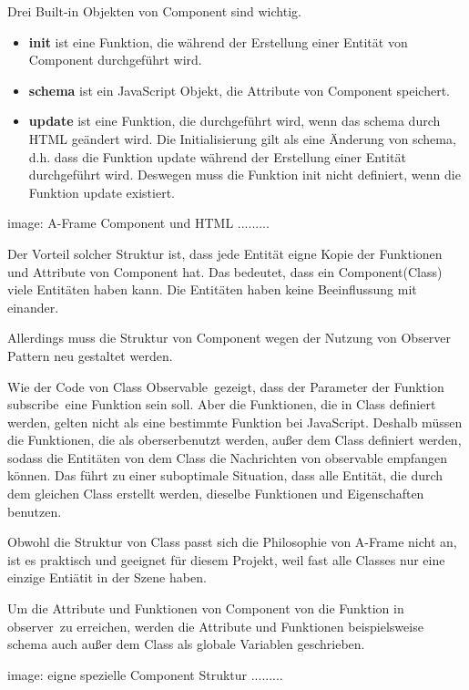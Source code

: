  Drei Built-in Objekten von Component sind wichtig.
 \begin{itemize}
     \item \textbf{init} ist eine Funktion, die während der Erstellung einer Entität von Component durchgeführt wird.
     \item \textbf{schema} ist ein JavaScript Objekt, die Attribute von Component speichert.
     \item \textbf{update} ist eine Funktion, die durchgeführt wird, wenn das schema durch HTML geändert wird. Die Initialisierung gilt als eine Änderung von schema, d.h. dass die Funktion update während der Erstellung einer Entität durchgeführt wird. Deswegen muss die Funktion init nicht definiert, wenn die Funktion update existiert.
 \end{itemize}
 
 image: A-Frame Component und HTML .........
 
 Der Vorteil solcher Struktur ist, dass jede Entität eigne Kopie der Funktionen und Attribute von Component hat. Das bedeutet, dass ein Component(Class) viele Entitäten haben kann. Die Entitäten haben keine Beeinflussung mit einander.
 
 Allerdings muss die Struktur von Component wegen der Nutzung von Observer Pattern neu gestaltet werden.
 
 Wie der Code von Class \glqq Observable\grqq\ gezeigt, dass der Parameter der Funktion \glqq subscribe\grqq\ eine Funktion sein soll. Aber die Funktionen, die in Class definiert werden, gelten nicht als eine bestimmte Funktion bei JavaScript. Deshalb müssen die Funktionen, die als \glqq oberser\grqq benutzt werden, außer dem Class definiert werden, sodass die Entitäten von dem Class die Nachrichten von observable empfangen können. Das führt zu einer suboptimale Situation, dass alle Entität, die durch dem gleichen Class erstellt werden, dieselbe Funktionen und Eigenschaften benutzen.
 
 Obwohl die Struktur von Class passt sich die Philosophie von A-Frame nicht an, ist es praktisch und geeignet für diesem Projekt, weil fast alle Classes nur eine einzige Entiätit in der Szene haben.
 
 Um die Attribute und Funktionen von Component von die Funktion in \glqq observer\grqq\ zu erreichen, werden die Attribute und Funktionen beispielsweise schema auch außer dem Class als globale Variablen geschrieben.
 
 image: eigne spezielle Component Struktur .........
 
